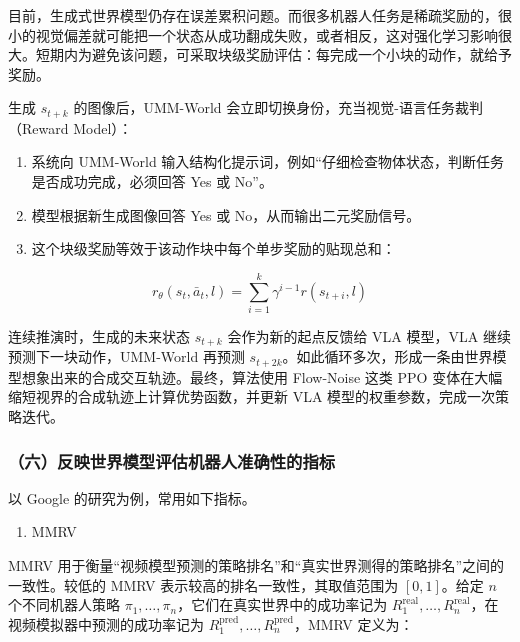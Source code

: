 目前，生成式世界模型仍存在误差累积问题。而很多机器人任务是稀疏奖励的，很小的视觉偏差就可能把一个状态从成功翻成失败，或者相反，这对强化学习影响很大。短期内为避免该问题，可采取块级奖励评估：每完成一个小块的动作，就给予奖励。

生成 \(s_{t+k}\) 的图像后，UMM-World 会立即切换身份，充当视觉-语言任务裁判（Reward Model）：

\begin{enumerate}
\def\labelenumi{\arabic{enumi}.}
\tightlist
\item
  系统向 UMM-World 输入结构化提示词，例如``仔细检查物体状态，判断任务是否成功完成，必须回答 Yes 或 No''。
\item
  模型根据新生成图像回答 Yes 或 No，从而输出二元奖励信号。
\item
  这个块级奖励等效于该动作块中每个单步奖励的贴现总和：
\end{enumerate}

\[
r_\theta(s_t, \bar{a}_t, l) = \sum_{i=1}^{k} \gamma^{i-1} r(s_{t+i}, l)
\]

连续推演时，生成的未来状态 \(s_{t+k}\) 会作为新的起点反馈给 VLA 模型，VLA 继续预测下一块动作，UMM-World 再预测 \(s_{t+2k}\)。如此循环多次，形成一条由世界模型想象出来的合成交互轨迹。最终，算法使用 Flow-Noise 这类 PPO 变体在大幅缩短视界的合成轨迹上计算优势函数，并更新 VLA 模型的权重参数，完成一次策略迭代。

\hypertarget{ux516dux53cdux6620ux4e16ux754cux6a21ux578bux8bc4ux4f30ux673aux5668ux4ebaux51c6ux786eux6027ux7684ux6307ux6807}{%
\subsubsection{（六）反映世界模型评估机器人准确性的指标}\label{ux516dux53cdux6620ux4e16ux754cux6a21ux578bux8bc4ux4f30ux673aux5668ux4ebaux51c6ux786eux6027ux7684ux6307ux6807}}

以 Google 的研究为例，常用如下指标。

\begin{enumerate}
\def\labelenumi{\arabic{enumi}.}
\tightlist
\item
  MMRV
\end{enumerate}

MMRV 用于衡量``视频模型预测的策略排名''和``真实世界测得的策略排名''之间的一致性。较低的 MMRV 表示较高的排名一致性，其取值范围为 \([0, 1]\)。给定 \(n\) 个不同机器人策略 \(\pi_1, \ldots, \pi_n\)，它们在真实世界中的成功率记为 \(R_1^{\mathrm{real}}, \ldots, R_n^{\mathrm{real}}\)，在视频模拟器中预测的成功率记为 \(R_1^{\mathrm{pred}}, \ldots, R_n^{\mathrm{pred}}\)，MMRV 定义为：

